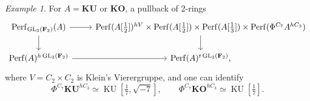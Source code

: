 \documentclass[11pt, a4paper]{article}
\DeclareMathOperator{\GL}{GL}
\newcommand{\1}{\mathbf{1}}
\DeclareMathOperator{\KU}{KU}
\newcommand{\gKU}{{\mathbf{KU}}}
\newcommand{\gKO}{{\mathbf{KO}}}
\DeclareMathOperator{\Perf}{Perf}
\newcommand{\F}{\mathbf{F}}
\theoremstyle{plain}
\theoremstyle{definition}
\theoremstyle{remark}\numberwithin{equation}{section}
\newtheorem{example}[equation]{Example}
\begin{document}


\begin{example}
    For $A=\gKU$ or $\gKO$, a pullback of 2-rings
    \[\begin{tikzcd}
        {\Perf_{\GL_3(\F_2)}(A)}\ar[r]\ar[d]    &   {\Perf(A[\tfrac{1}{2}])^{hV} \times \Perf(A[\tfrac{1}{2}]) \times \Perf(A[\tfrac{1}{3}]) \times \Perf(\Phi^{C_7} A^{hC_3})}\ar[d]    \\
        {\Perf(A)^{h\GL_3(\F_2)}}\ar[r]         &   {\Perf(A)^{t\GL_3(\F_2)},}
    \end{tikzcd}\]
    where $V=C_2\times C_2$ is Klein's Vierergruppe, and one can identify
    \begin{equation}\label{eq:c7geo}\Phi^{C_7} \gKU^{hC_3} \simeq \KU[\tfrac{1}{7}, \sqrt{-7}], \qquad \Phi^{C_7} \gKO^{hC_3} \simeq \KU[\tfrac{1}{7}].\end{equation}
\end{example}
\end{document}
